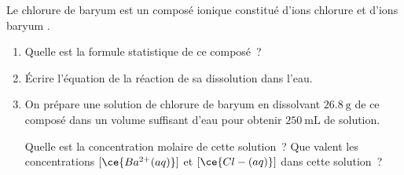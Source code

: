 Le chlorure de baryum est un composé ionique constitué d'ions chlorure et d'ions
baryum .
\begin{enumerate}
    \item Quelle est la formule statistique de ce composé~?
    \item Écrire l'équation de la réaction de sa dissolution dans l'eau.
    \item On prépare une solution de chlorure de baryum en dissolvant
          $\qty{26.8}{\g}$ de ce composé dans un volume suffisant d'eau pour
          obtenir $\qty{250}{\mL}$ de solution.
    
          Quelle est la concentration molaire de cette solution~? Que valent les
          concentrations $[\ce{Ba^{2+}(aq)}]$ et
          $[\ce{Cl-(aq)}]$ dans cette solution~?
\end{enumerate}

